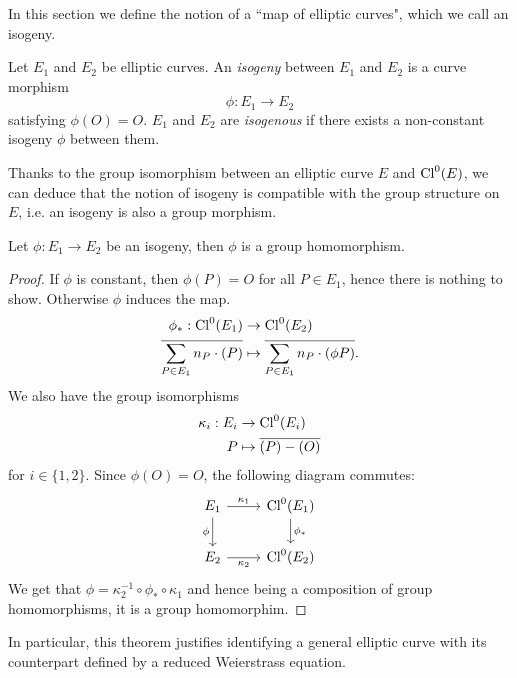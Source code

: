 In this section we define the notion of a ``map of elliptic curves", 
which we call an isogeny.
\begin{definition}
	Let $E_1$ and $E_2$ be elliptic curves. An \emph{isogeny} between
	$E_1$ and $E_2$ is a curve morphism
	\begin{equation*}
		\phi: E_1 \to E_2
	\end{equation*}
	satisfying $\phi(O) = O$. $E_1$ and $E_2$ are \emph{isogenous} if
	there exists a non-constant isogeny $\phi$ between them.
\end{definition}
Thanks to the group isomorphism between an elliptic curve $E$ and $\operatorname{Cl}^0(E)$,
we can deduce that the notion of isogeny is compatible with the group structure
on $E$, i.e. an isogeny is also a group morphism.


\begin{theorem}
	Let $\phi: E_1 \to E_2$ be an isogeny, then $\phi$ is a group homomorphism.
\end{theorem}
\begin{proof}
	If $\phi$ is constant, then $\phi(P) = O$ for all $P \in E_1$, hence
	there is nothing to show. Otherwise $\phi$ induces
	the map.
	\begin{align*}
		\phi_*: \operatorname{Cl}^0(E_1) &\to \operatorname{Cl}^0(E_2)\\
		\overline{\sum_{P \in E_1}n_P\cdot(P)} &\mapsto
		\overline{\sum_{P \in E_1} n_P \cdot(\phi P)}.
	\end{align*}
	We also have the group isomorphisms
	\begin{align*}
		\kappa_i: E_i &\to \operatorname{Cl}^0(E_i)\\
		P &\mapsto \overline{(P) - (O)}
	\end{align*}
	for $i \in \{1, 2\}$. Since $\phi(O) = O$, the following diagram commutes:
	\begin{equation*}
		\begin{tikzcd}
			{E_1} & {\Cl^0(E_1)} \\
			{E_2} & {\Cl^0(E_2)}
			\arrow["\phi"', from=1-1, to=2-1]
			\arrow["{\kappa_2}"', from=2-1, to=2-2]
			\arrow["{\kappa_1}", from=1-1, to=1-2]
			\arrow["{\phi_*}", from=1-2, to=2-2]
		\end{tikzcd}
	\end{equation*}
	We get that $\phi = \kappa_2^{-1}\circ \phi_* \circ \kappa_1$ and hence
	being a composition of group homomorphisms, it is
	a group homomorphim.
\end{proof}
In particular, this theorem justifies identifying a general elliptic
curve with its counterpart defined by a reduced Weierstrass equation.

